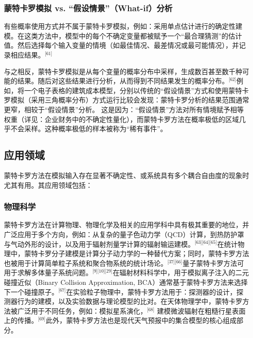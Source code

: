 \subsubsection{蒙特卡罗模拟 vs. “假设情景”（What-if）分析}
有些概率使用方式并不属于蒙特卡罗模拟，例如：采用单点估计进行的确定性建模。在这类方法中，模型中的每个不确定变量都被赋予一个“最合理猜测”的估计值。然后选择每个输入变量的情境（如最佳情况、最差情况或最可能情况），并记录相应结果。\(^\text{[61]}\)

与之相反，蒙特卡罗模拟是从每个变量的概率分布中采样，生成数百甚至数千种可能的结果。随后对这些结果进行分析，从而得到不同结果发生的概率分布。\(^\text{[62]}\)例如，将一个电子表格的建筑成本模型，分别以传统的“假设情景”方式和使用蒙特卡罗模拟（采用三角概率分布）方式运行比较会发现：蒙特卡罗分析的结果范围通常更窄，相较于“假设情景”分析。 这是因为：“假设情景”方法对所有情境赋予相等权重（详见：企业财务中的不确定性量化），而蒙特卡罗方法在概率极低的区域几乎不会采样。这种概率极低的样本被称为“稀有事件”。
\subsection{应用领域}
蒙特卡罗方法在模拟输入存在显著不确定性、或系统具有多个耦合自由度的现象时尤其有用。其应用领域包括：
\subsubsection{物理科学}
蒙特卡罗方法在计算物理、物理化学及相关的应用学科中具有极其重要的地位，并广泛应用于多个方向，例如：从复杂的量子色动力学（QCD）计算，到热防护罩与气动外形的设计，以及用于辐射剂量学计算的辐射输运建模。\(^\text{[63][64][65]}\)在统计物理中，蒙特卡罗分子建模是计算分子动力学的一种替代方案；同时，蒙特卡罗方法也被用于计算简单粒子系统和聚合物系统的统计场论。\(^\text{[37][66]}\)量子蒙特卡罗方法可用于求解多体量子系统问题。\(^\text{[9][10][29]}\)在辐射材料科学中，用于模拟离子注入的二元碰撞近似（Binary Collision Approximation, BCA）通常基于蒙特卡罗方法来选择下一个碰撞原子。\(^\text{[67]}\)在实验粒子物理中，蒙特卡罗方法用于：探测器的设计，探测器行为的建模，以及实验数据与理论模型的比对。在天体物理学中，蒙特卡罗方法被广泛用于不同任务，例如：模拟星系演化，\(^\text{[68]}\)
建模微波辐射在粗糙行星表面上的传播。\(^\text{[69]}\)此外，蒙特卡罗方法也是现代天气预报中的集合模型的核心组成部分。
